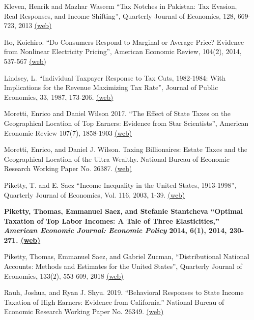 \documentclass[landscape]{slides}
\begin{document}
\begin{slide}
{Kleven, Henrik and Mazhar Waseem ``Tax Notches in Pakistan: Tax Evasion, Real Responses, and Income Shifting'', Quarterly Journal of Economics, 128, 669-723, 2013
\href{http://elsa.berkeley.edu/~saez/course/kleven-waseem_qje2013.pdf} {(web)}

Ito, Koichiro. ``Do Consumers Respond to Marginal or Average Price?
Evidence from Nonlinear Electricity Pricing'', 
American Economic Review, 104(2), 2014, 537-567 \href{http://elsa.berkeley.edu/~saez/course/koichiroAER14.pdf} {(web)} 

Lindsey, L. ``Individual Taxpayer Response to Tax Cuts, 1982-1984: With Implications for the Revenue Maximizing Tax Rate'', Journal of Public Economics, 33, 1987, 173-206. \href{http://elsa.berkeley.edu/~saez/course/Lindsey_JPubE(1987).pdf} {(web)}

Moretti, Enrico and Daniel Wilson 2017. ``The Effect of State Taxes on the Geographical Location of Top Earners: Evidence from Star Scientists'', American Economic Review 107(7), 1858-1903 \href{http://elsa.berkeley.edu/~saez/course/moretti-wilsonAER17mobility.pdf} {(web)}

Moretti, Enrico, and Daniel J. Wilson. Taxing Billionaires: Estate Taxes and the Geographical Location of the Ultra-Wealthy. National Bureau of Economic Research Working Paper No. 26387.
\href{https://www.nber.org/papers/w26387.pdf} {(web)}

Piketty, T. and E. Saez ``Income Inequality in the United States, 1913-1998'', Quarterly Journal of Economics, Vol. 116, 2003, 1-39. \href{http://links.jstor.org/stable/pdfplus/25053897.pdf} {(web)}

\textbf{Piketty, Thomas, Emmanuel Saez, and Stefanie Stantcheva ``Optimal Taxation of Top Labor Incomes: A Tale of Three Elasticities,'' \emph{American Economic Journal: Economic Policy} 2014, 6(1), 2014, 230-271.
\href{http://elsa.berkeley.edu/~saez/piketty-saez-stantchevaAEJ14.pdf} {(web)} }

Piketty, Thomas, Emmanuel Saez, and Gabriel Zucman,  ``Distributional National Accounts:
Methods and Estimates for the United States'', Quarterly Journal of Economics, 133(2), 553-609, 2018
\href{https://eml.berkeley.edu/~saez/PSZ2018QJE.pdf} {(web)}

Rauh, Joshua, and Ryan J. Shyu. 2019. ``Behavioral Responses to State Income Taxation of High Earners: Evidence from California.'' National Bureau of Economic Research Working Paper No. 26349.
\href{https://www.nber.org/papers/w26349.pdf} {(web)} 

}
\end{slide}
\end{document}
